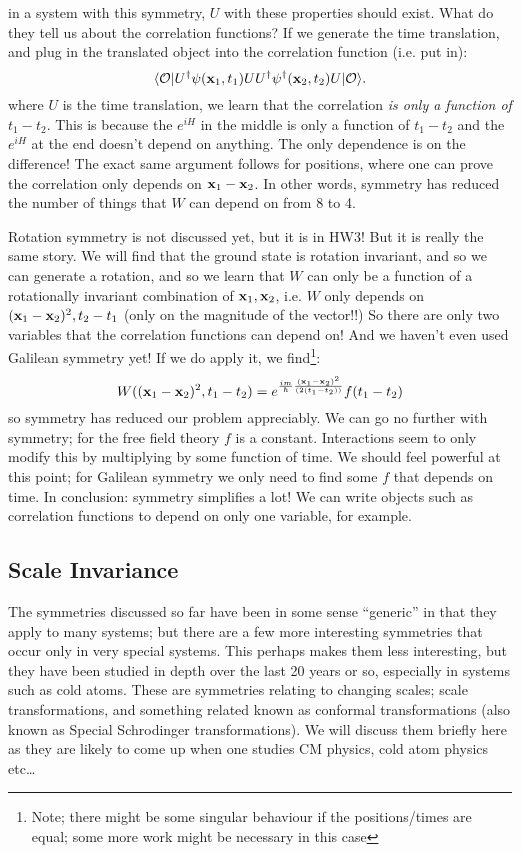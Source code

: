 in a system with this symmetry, $U$ with these properties should exist. What do they tell us about the correlation functions? If we generate the time translation, and plug in the translated object into the correlation function (i.e. put in):
\begin{equation}
    \langle \mathcal{O} \rvert U^\dagger \psi(\mathbf{x}_1, t_1)UU^\dagger \psi^\dagger(\mathbf{x}_2, t_2)U\lvert \mathcal{O} \rangle.
\end{equation}
where $U$ is the time translation, we learn that the correlation \emph{is only a function of $t_1 - t_2$}. This is because the $e^{iH}$ in the middle is only a function of $t_1 - t_2$ and the $e^{iH}$ at the end doesn't depend on anything. The only dependence is on the difference! The exact same argument follows for positions, where one can prove the correlation only depends on $\mathbf{x}_1 - \mathbf{x}_2$. In other words, symmetry has reduced the number of things that $W$ can depend on from 8 to 4. 

Rotation symmetry is not discussed yet, but it is in HW3! But it is really the same story. We will find that the ground state is rotation invariant, and so we can generate a rotation, and so we learn that $W$ can only be a function of a rotationally invariant combination of $\mathbf{x}_1, \mathbf{x}_2$, i.e. $W$ only depends on $(\mathbf{x}_1 - \mathbf{x}_2)^2, t_2 - t_1$ (only on the magnitude of the vector!!) So there are only two variables that the correlation functions can depend on! And we haven't even used Galilean symmetry yet! If we do apply it, we find\footnote{Note; there might be some singular behaviour if the positions/times are equal; some more work might be necessary in this case}:
\begin{equation}
    W((\mathbf{x}_1 - \mathbf{x}_2)^2, t_1 - t_2) = e^{\frac{im}{\hbar}\frac{(\mathbf{x}_1 - \mathbf{x}_2)^2}{(2(t_1 - t_2))}}f(t_1 - t_2)
\end{equation}
so symmetry has reduced our problem appreciably. We can go no further with symmetry; for the free field theory $f$ is a constant. Interactions seem to only modify this by multiplying by some function of time. We should feel powerful at this point; for Galilean symmetry we only need to find some $f$ that depends on time. In conclusion: symmetry simplifies a lot! We can write objects such as correlation functions to depend on only one variable, for example.

\subsection{Scale Invariance}
The symmetries discussed so far have been in some sense ``generic'' in that they apply to many systems; but there are a few more interesting symmetries that occur only in very special systems. This perhaps makes them less interesting, but they have been studied in depth over the last 20 years or so, especially in systems such as cold atoms. These are symmetries relating to changing scales; scale transformations, and something related known as conformal transformations (also known as Special Schrodinger transformations). We will discuss them briefly here as they are likely to come up when one studies CM physics, cold atom physics etc\dots

